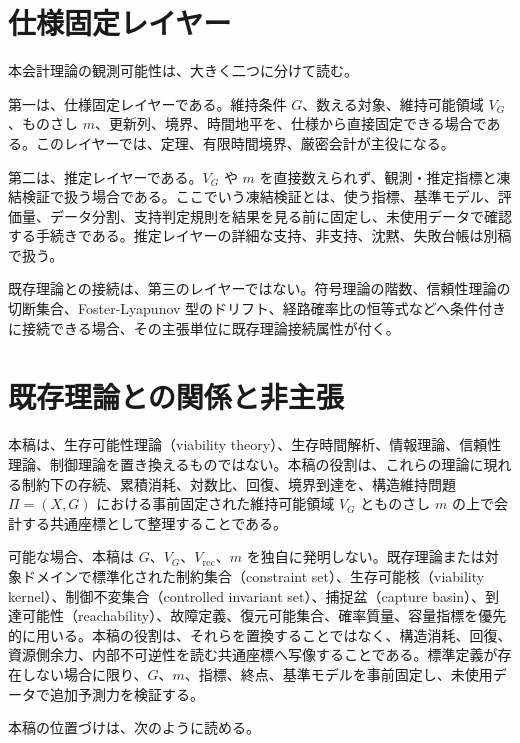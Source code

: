 \documentclass[12pt,a4paper]{article}
\begin{document}
\section{仕様固定レイヤー}\label{ux4ed5ux69d8ux56faux5b9aux30ecux30a4ux30e4ux30fc}

本会計理論の観測可能性は、大きく二つに分けて読む。

第一は、仕様固定レイヤーである。維持条件 \(G\)、数える対象、維持可能領域 \(V_{G}\)、ものさし \(m\)、更新列、境界、時間地平を、仕様から直接固定できる場合である。このレイヤーでは、定理、有限時間境界、厳密会計が主役になる。

第二は、推定レイヤーである。\(V_{G}\) や \(m\) を直接数えられず、観測・推定指標と凍結検証で扱う場合である。ここでいう凍結検証とは、使う指標、基準モデル、評価量、データ分割、支持判定規則を結果を見る前に固定し、未使用データで確認する手続きである。推定レイヤーの詳細な支持、非支持、沈黙、失敗台帳は別稿で扱う。

既存理論との接続は、第三のレイヤーではない。符号理論の階数、信頼性理論の切断集合、Foster-Lyapunov 型のドリフト、経路確率比の恒等式などへ条件付きに接続できる場合、その主張単位に既存理論接続属性が付く。

\section{既存理論との関係と非主張}\label{ux65e2ux5b58ux7406ux8ad6ux3068ux306eux95a2ux4fc2ux3068ux975eux4e3bux5f35}

本稿は、生存可能性理論（viability theory）、生存時間解析、情報理論、信頼性理論、制御理論を置き換えるものではない。本稿の役割は、これらの理論に現れる制約下の存続、累積消耗、対数比、回復、境界到達を、構造維持問題 \(\Pi=(X,G)\) における事前固定された維持可能領域 \(V_{G}\) とものさし \(m\) の上で会計する共通座標として整理することである。

可能な場合、本稿は \(G\)、\(V_{G}\)、\(V_{\mathrm{rec}}\)、\(m\) を独自に発明しない。既存理論または対象ドメインで標準化された制約集合（constraint set）、生存可能核（viability kernel）、制御不変集合（controlled invariant set）、捕捉盆（capture basin）、到達可能性（reachability）、故障定義、復元可能集合、確率質量、容量指標を優先的に用いる。本稿の役割は、それらを置換することではなく、構造消耗、回復、資源側余力、内部不可逆性を読む共通座標へ写像することである。標準定義が存在しない場合に限り、\(G\)、\(m\)、指標、終点、基準モデルを事前固定し、未使用データで追加予測力を検証する。

本稿の位置づけは、次のように読める。
\end{document}
